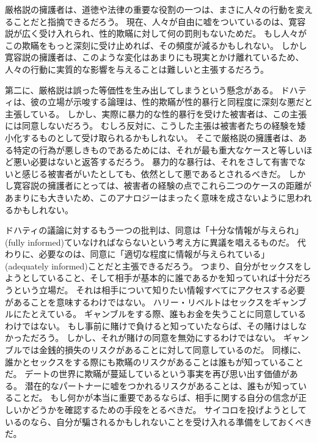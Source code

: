 \documentclass[paper=a4,book,openany]{jlreq}
\begin{document}
厳格説の擁護者は、道徳や法律の重要な役割の一つは、まさに人々の行動を変えることだと指摘できるだろう。
現在、人々が自由に嘘をついているのは、寛容説が広く受け入れられ、性的欺瞞に対して何の罰則もないためだ。
もし人々がこの欺瞞をもっと深刻に受け止めれば、その頻度が減るかもしれない。
しかし寛容説の擁護者は、このような変化はあまりにも現実とかけ離れているため、人々の行動に実質的な影響を与えることは難しいと主張するだろう。

第二に、厳格説は誤った等価性を生み出してしまうという懸念がある。
ドハティは、彼の立場が示唆する論理は、性的欺瞞が性的暴行と同程度に深刻な悪だと主張している。
しかし、実際に暴力的な性的暴行を受けた被害者は、この主張には同意しないだろう。
むしろ反対に、こうした主張は被害者たちの経験を矮小化するものとして受け取られるかもしれない。
そこで厳格説の擁護者は、ある特定の行為が悪しきものであるためには、それが最も重大なケースと等しいほど悪い必要はないと返答するだろう。
暴力的な暴行は、それをさして有害でないと感じる被害者がいたとしても、依然として悪であるとされるべきだ。
しかし寛容説の擁護者にとっては、被害者の経験の点でこれら二つのケースの距離があまりにも大きいため、このアナロジーはまったく意味を成さないように思われるかもしれない。

ドハティの議論に対するもう一つの批判は、同意は「十分な情報が与えられ」(fully informed)ていなければならないという考え方に異議を唱えるものだ。
代わりに、必要なのは、同意に「適切な程度に情報が与えられている」(adequately informed)ことだと主張できるだろう。
つまり、自分がセックスをしようとしていること、そして相手が基本的に誰であるかを知っていれば十分だろうという立場だ。
それは相手について知りたい情報すべてにアクセスする必要があることを意味するわけではない。
ハリー・リベルトはセックスをギャンブルにたとえている。
ギャンブルをする際、誰もお金を失うことに同意しているわけではない。
もし事前に賭けで負けると知っていたならば、その賭けはしなかっただろう。
しかし、それが賭けの同意を無効にするわけではない。
ギャンブルでは金銭的損失のリスクがあることに対して同意しているのだ。
同様に、誰かとセックスをする際にも欺瞞のリスクがあることは誰もが知っていることだ。
\citep[p.132]{liberto17:_inten_sexual_consen}
デートの世界に欺瞞が蔓延しているという事実を再び思い出す価値がある。
潜在的なパートナーに嘘をつかれるリスクがあることは、誰もが知っていることだ。
もし何かが本当に重要であるならば、相手に関する自分の信念が正しいかどうかを確認するための手段をとるべきだ。
サイコロを投げようとしているのなら、自分が騙されるかもしれないことを受け入れる準備をしておくべきだ。
\end{document}
